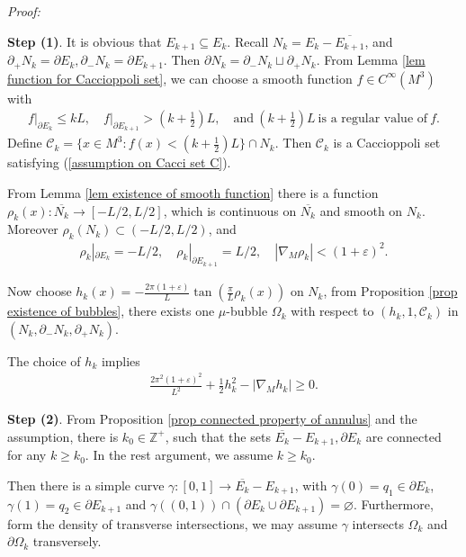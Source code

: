 \documentclass[11pt]{amsart}
\numberwithin{equation}{section}
\def\pf{{\it Proof:}~}
\begin{document}
\pf
{\textbf{Step (1)}. It is obvious that $E_{k+ 1}\subseteq E_k$. Recall $N_k= E_k- \overline{E_{k+ 1}}$, and $\partial_+N_k= \partial E_k, \partial_-N_k= \partial E_{k+ 1}$. Then $\partial N_k= \partial_- N_k\sqcup \partial_+ N_k$. From Lemma \ref{lem function for Caccioppoli set}, we can choose a smooth function $f\in C^\infty(M^3)$ with 
\begin{align}
f\big|_{\partial E_k}\leq kL, \quad f\big|_{\partial E_{k+ 1}}> (k+ \frac{1}{2})L, \quad  \text{and} \ (k+ \frac{1}{2})L\ \text{is a regular value of} \ f. \nonumber 
\end{align}
Define $\mathcal{C}_k= \{x\in M^3: f(x)< (k+ \frac{1}{2})L\}\cap N_k$. Then $\mathcal{C}_k$ is a Caccioppoli set satisfying (\ref{assumption on Cacci set C}). 


From Lemma \ref{lem existence of smooth function} there is a function $\rho_k(x):\overline{N_k}\to [-L/2,L/2]$, which is continuous on $\overline{N_k}$ and smooth on $N_k$. Moreover $\rho_k(N_k)\subset(-L/2,L/2)$, and
\begin{align*}
    \rho_k|_{\partial E_k} = -L/2, \quad \rho_k|_{\partial E_{k+1}} = L/2, \quad |\nabla_M \rho_k|<(1+\varepsilon)^2.
\end{align*}

Now choose $h_k(x)= -\frac{2\pi(1+\varepsilon)}{L}\tan(\frac{\pi}{L}\rho_k(x))$ on $N_k$, from Proposition \ref{prop existence of bubbles}, there exists one $\mu$-bubble $\Omega_k$ with respect to $(h_k, 1, \mathcal{C}_k)$ in $(N_k, \partial_{-}N_k, \partial_{+}N_k)$. 

The choice of $h_k$ implies
\begin{align}
\frac{2\pi^2(1+\varepsilon)^2}{L^2}+ \frac{1}{2}h_k^2- |\nabla_M h_k|\geq 0. \label{ineq of h-1}
\end{align}

\textbf{Step (2)}. From Proposition \ref{prop connected property of annulus} and the assumption, there is $k_0\in \mathbb{Z}^+$, such that the sets $\overline{E_k}- E_{k+ 1}, \partial E_k$ are connected for any $k\geq k_0$. In the rest argument, we assume $k\geq k_0$.

Then there is a simple curve $\gamma:[0,1]\to\overline{E_k}- E_{k+ 1}$, with $\gamma(0)=q_1\in\partial E_k$, $\gamma(1)=q_2\in\partial E_{k+1}$ and $\gamma((0,1))\cap (\partial E_k\cup\partial E_{k+1}) =\varnothing$. Furthermore, form the density of transverse intersections, we may assume $\gamma$ intersects $\Omega_k$ and $\partial \Omega_k$ transversely. 

}
\end{document}
